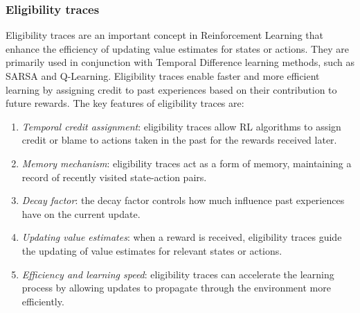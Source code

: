 \subsubsection{Eligibility traces}
Eligibility traces are an important concept in Reinforcement Learning that enhance the efficiency of updating value estimates for states or actions. 
They are primarily used in conjunction with Temporal Difference learning methods, such as SARSA and Q-Learning. 
Eligibility traces enable faster and more efficient learning by assigning credit to past experiences based on their contribution to future rewards.
The key features of eligibility traces are:
\begin{enumerate}
    \item \textit{Temporal credit assignment}: eligibility traces allow RL algorithms to assign credit or blame to actions taken in the past for the rewards received later.
    \item \textit{Memory mechanism}: eligibility traces act as a form of memory, maintaining a record of recently visited state-action pairs.
    \item \textit{Decay factor}: the decay factor controls how much influence past experiences have on the current update.
    \item \textit{Updating value estimates}: when a reward is received, eligibility traces guide the updating of value estimates for relevant states or actions.
    \item \textit{Efficiency and learning speed}: eligibility traces can accelerate the learning process by allowing updates to propagate through the environment more efficiently. 
\end{enumerate}

